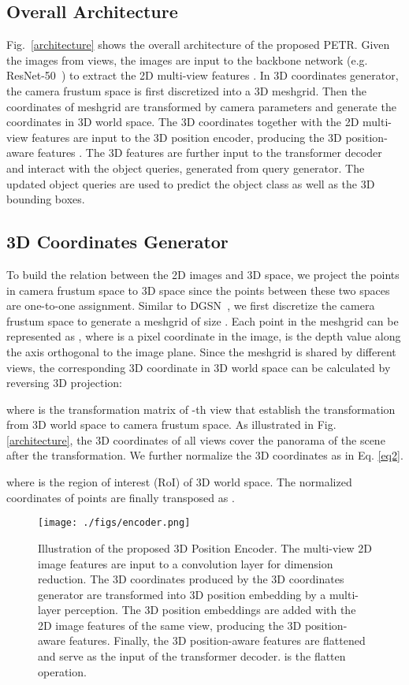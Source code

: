 \documentclass[runningheads]{llncs}
\begin{document}
\subsection{Overall Architecture}
Fig.~\ref{architecture} shows the overall architecture of the proposed PETR. Given the images  from  views, the images are input to the backbone network (e.g. ResNet-50~\cite{he2016resnet}) to extract the 2D multi-view features  . In 3D coordinates generator, the camera frustum space is first discretized into a 3D meshgrid. Then the coordinates of meshgrid are transformed by camera parameters and generate the coordinates in 3D world space. The 3D coordinates together with the 2D multi-view features are input to the 3D position encoder, producing the 3D position-aware features . The 3D features are further input to the transformer decoder and interact with the object queries, generated from query generator. The updated object queries are used to predict the object class as well as the 3D bounding boxes.



\subsection{3D Coordinates Generator}
To build the relation between the 2D images and 3D space, we project the points in camera frustum space to 3D space since the points between these two spaces are one-to-one assignment. Similar to DGSN~\cite{chen2020dsgn}, we first discretize the camera frustum space to generate a meshgrid of size . Each point in the meshgrid can be represented as , where  is a pixel coordinate in the image,  is the depth value along the axis orthogonal to the image plane. Since the meshgrid is shared by different views, the corresponding 3D coordinate  in 3D world space can be calculated by reversing 3D projection:

where  is the transformation matrix of -th view that establish the transformation from 3D world space to camera frustum space. As illustrated in Fig. \ref{architecture}, the 3D coordinates of all views cover the panorama of the scene after the transformation. We further normalize the 3D coordinates as in Eq. \ref{eq2}.

where  is the region of interest (RoI) of 3D world space. The normalized coordinates of  points are finally transposed as .

\begin{figure*}[t]
	\centering  
	\texttt{[image: ./figs/encoder.png]}  
	\caption{Illustration of the proposed 3D Position Encoder. The multi-view 2D image features are input to a  convolution layer for dimension reduction. The 3D coordinates produced by the 3D coordinates generator are transformed into 3D position embedding by a multi-layer perception. The 3D position embeddings are added with the 2D image features of the same view, producing the 3D position-aware features. Finally, the 3D position-aware features are flattened and serve as the input of the transformer decoder.    is the flatten operation.}  
	\label{fig2}
\end{figure*}
\end{document}
